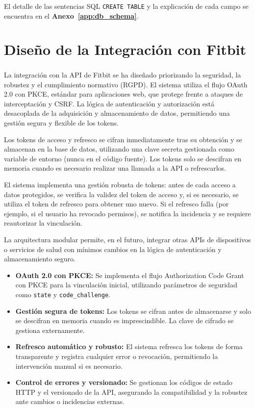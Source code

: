El detalle de las sentencias SQL \texttt{CREATE TABLE} y la explicación de cada campo se encuentra en el \textbf{Anexo~\ref{app:db_schema}}.

\section{Diseño de la Integración con Fitbit}
\label{sec:diseno_integracion_fitbit}

La integración con la API de Fitbit\textsuperscript{\textregistered} se ha diseñado priorizando la seguridad, la robustez y el cumplimiento normativo (RGPD). El sistema utiliza el flujo OAuth 2.0 con PKCE, estándar para aplicaciones web, que protege frente a ataques de interceptación y CSRF. La lógica de autenticación y autorización está desacoplada de la adquisición y almacenamiento de datos, permitiendo una gestión segura y flexible de los tokens.

Los tokens de acceso y refresco se cifran inmediatamente tras su obtención y se almacenan en la base de datos, utilizando una clave secreta gestionada como variable de entorno (nunca en el código fuente). Los tokens solo se descifran en memoria cuando es necesario realizar una llamada a la API o refrescarlos.

El sistema implementa una gestión robusta de tokens: antes de cada acceso a datos protegidos, se verifica la validez del token de acceso y, si es necesario, se utiliza el token de refresco para obtener uno nuevo. Si el refresco falla (por ejemplo, si el usuario ha revocado permisos), se notifica la incidencia y se requiere reautorizar la vinculación.

La arquitectura modular permite, en el futuro, integrar otras APIs de dispositivos o servicios de salud con mínimos cambios en la lógica de autenticación y almacenamiento seguro.

\begin{itemize}
    \item \textbf{OAuth 2.0 con PKCE:} Se implementa el flujo Authorization Code Grant con PKCE para la vinculación inicial, utilizando parámetros de seguridad como \texttt{state} y \texttt{code\_challenge}.
    \item \textbf{Gestión segura de tokens:} Los tokens se cifran antes de almacenarse y solo se descifran en memoria cuando es imprescindible. La clave de cifrado se gestiona externamente.
    \item \textbf{Refresco automático y robusto:} El sistema refresca los tokens de forma transparente y registra cualquier error o revocación, permitiendo la intervención manual si es necesario.
    \item \textbf{Control de errores y versionado:} Se gestionan los códigos de estado HTTP y el versionado de la API, asegurando la compatibilidad y la robustez ante cambios o incidencias externas.
\end{itemize}

